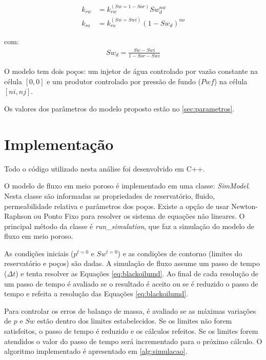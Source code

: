 \documentclass[final,5p]{elsarticle}
\numberwithin{equation}{section}
\begin{document}
        \begin{subequations}
            \begin{align}
                k_{rw} &= k_{rw}^{(Sw=1-Sor)} Sw_d^{nw}  \\
                k_{ro} &= k_{ro}^{(Sw=Swi)} (1-Sw_d)^{no}
            \end{align}
            \label{eq:corey}
        \end{subequations}

        \noindent com:
        \begin{align}
            Sw_d = \frac{Sw - Swi}{1-Sor-Swi} \nonumber
        \end{align}

        O modelo tem dois poços: um injetor de água controlado por vazão constante na célula $[0,0]$ e um produtor controlado por pressão de fundo ($Pwf$) na célula $[ni,nj]$.

        Os valores dos parâmetros do modelo proposto estão no \ref{sec:parametros}.

    \section{Implementação} \label{sec:implementacao}

        Todo o código utilizado nesta análise foi desenvolvido em C++.

        O modelo de fluxo em meio poroso é implementado em uma classe: \emph{SimModel}. Nesta classe são informadas as propriedades de reservatório, fluido, permeabilidade relativa e parâmetros dos poços. Existe a opção de usar Newton-Raphson ou Ponto Fixo para resolver os sistema de equações não lineares. O principal método da classe é \emph{run\_simulation}, que faz a simulação do modelo de fluxo em meio poroso.

        As condições iniciais ($p^{t=0}$ e $Sw^{t=0}$) e as condições de contorno (limites do reservatório e poços) são dadas. A simulação de fluxo assume um passo de tempo ($\Delta t$) e tenta resolver as Equações \ref{eq:blackoilumd}. Ao final de cada resolução de um passo de tempo é avaliado se o resultado é aceito ou se é reduzido o passo de tempo e refeita a resolução das Equações \ref{eq:blackoilumd}.

        Para controlar os erros de balanço de massa, é avaliado se as máximas variações de $p$ e $Sw$ estão dentro dos limites estabelecidos. Se os limites não forem satisfeitos, o passo de tempo é reduzido e os cálculos refeitos. Se os limites forem atendidos o valor do passo de tempo será incrementado para o próximo cálculo. O algoritmo implementado é apresentado em \ref{alg:simulacao}.
\end{document}
